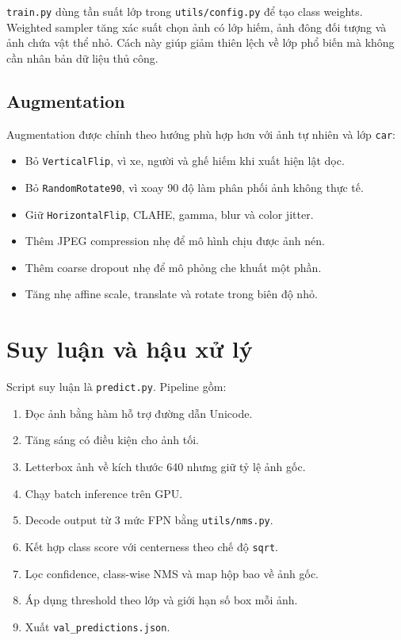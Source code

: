 \documentclass[12pt,a4paper]{article}
\begin{document}
\texttt{train.py} dùng tần suất lớp trong \texttt{utils/config.py} để tạo class weights. Weighted sampler tăng xác suất chọn ảnh có lớp hiếm, ảnh đông đối tượng và ảnh chứa vật thể nhỏ. Cách này giúp giảm thiên lệch về lớp phổ biến mà không cần nhân bản dữ liệu thủ công.

\subsection{Augmentation}

Augmentation được chỉnh theo hướng phù hợp hơn với ảnh tự nhiên và lớp \texttt{car}:

\begin{itemize}
  \item Bỏ \texttt{VerticalFlip}, vì xe, người và ghế hiếm khi xuất hiện lật dọc.
  \item Bỏ \texttt{RandomRotate90}, vì xoay 90 độ làm phân phối ảnh không thực tế.
  \item Giữ \texttt{HorizontalFlip}, CLAHE, gamma, blur và color jitter.
  \item Thêm JPEG compression nhẹ để mô hình chịu được ảnh nén.
  \item Thêm coarse dropout nhẹ để mô phỏng che khuất một phần.
  \item Tăng nhẹ affine scale, translate và rotate trong biên độ nhỏ.
\end{itemize}

\section{Suy luận và hậu xử lý}

Script suy luận là \texttt{predict.py}. Pipeline gồm:

\begin{enumerate}
  \item Đọc ảnh bằng hàm hỗ trợ đường dẫn Unicode.
  \item Tăng sáng có điều kiện cho ảnh tối.
  \item Letterbox ảnh về kích thước 640 nhưng giữ tỷ lệ ảnh gốc.
  \item Chạy batch inference trên GPU.
  \item Decode output từ 3 mức FPN bằng \texttt{utils/nms.py}.
  \item Kết hợp class score với centerness theo chế độ \texttt{sqrt}.
  \item Lọc confidence, class-wise NMS và map hộp bao về ảnh gốc.
  \item Áp dụng threshold theo lớp và giới hạn số box mỗi ảnh.
  \item Xuất \texttt{val\_predictions.json}.
\end{enumerate}
\end{document}
